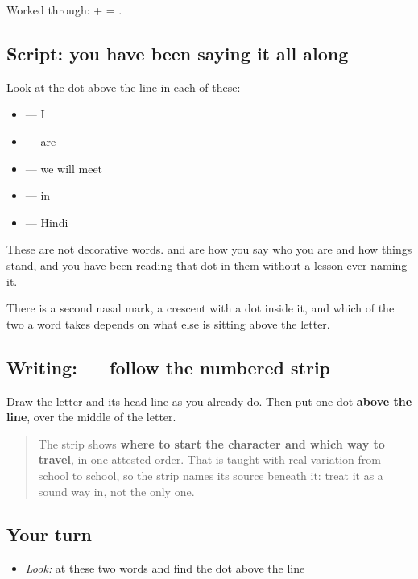 Worked through: \textbf{} + \textbf{} = \textbf{}.

\subsection*{Script: you have been saying it all along}
Look at the dot above the line in each of these:

\begin{itemize}
\raggedright
  \item \textbf{} — I
  \item \textbf{} — are
  \item \textbf{} — we will meet
  \item \textbf{} — in
  \item \textbf{} — Hindi
\end{itemize}

These are not decorative words. \textbf{} and \textbf{} are how you say who you are and how things stand, and you have been reading that dot in them without a lesson ever naming it.

There is a second nasal mark, a crescent with a dot inside it, and which of the two a word takes depends on what else is sitting above the letter.

\subsection*{Writing:  — follow the numbered strip}

Draw the letter and its head-line as you already do. Then put one dot \textbf{above the line}, over the middle of the letter.

\begin{quote}
The strip shows \textbf{where to start the character and which way to travel}, in one attested order. That is taught with real variation from school to school, so the strip names its source beneath it: treat it as a sound way in, not the only one.
\end{quote}

\subsection*{Your turn}
\begin{itemize}
\raggedright
  \item \emph{Look:} at these two words and find the dot above the line
\end{itemize}

